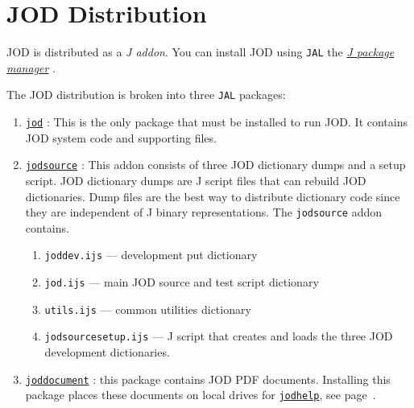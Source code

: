 
\appendix

    \newpage
    \section{JOD Distribution}
   
   
   JOD is distributed as a \emph{J addon}.  
   You can install JOD using \texttt{JAL} the  
   \href{http://www.jsoftware.com/jwiki/JAL/Package_Manager?highlight=%28JAL%29}{\emph{J package manager}} \cite{jwiki:jal}.
   
   
   The JOD distribution is broken into three \texttt{JAL} packages:
   \begin{enumerate}
	\item  \href{http://www.jsoftware.com/jwiki/Addons/general/jod}{\texttt{jod}} 
	\cite{baker:jod}:  This is the only package that must be installed to run JOD.  
	It contains  JOD system code and supporting files.
	\item  \href{http://www.jsoftware.com/jwiki/Addons/general/jodsource}{\texttt{jodsource}}
	 \cite{baker:jodsource}: This addon consists of three 
	   JOD dictionary dumps and a setup script.  JOD dictionary dumps
	  are J script files that can rebuild  JOD dictionaries.  Dump files are the best way to
	  distribute dictionary code since they are independent of J binary representations. 
	  The \texttt{jodsource} addon contains.
  \begin{enumerate}
	  \item \texttt{joddev.ijs} --- development put dictionary
	  \item \texttt{jod.ijs} --- main JOD source and test script dictionary
	  \item \texttt{utils.ijs}  --- common utilities dictionary
     \item \texttt{jodsourcesetup.ijs} --- J script that creates and loads the three
     JOD development dictionaries.
  \end{enumerate}
  \item \href{http://www.jsoftware.com/jwiki/Addons/general/joddocument}{\texttt{joddocument}} \cite{baker:joddocument}: this package contains 
  JOD PDF documents. Installing this
  package places these documents on local drives 
  for \hyperlink{il:jodhelp}{\texttt{jodhelp}}, see page~\pageref{ss:jodhelp}.  
\end{enumerate}
 
